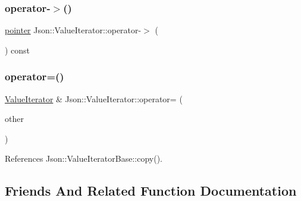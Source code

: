\mbox{\label{classJson_1_1ValueIterator_a8dfc1603f92467591d524d0326f35534_a8dfc1603f92467591d524d0326f35534}} 
\subsubsection{\texorpdfstring{operator-\/$>$()}{operator->()}}
{\footnotesize\ttfamily \hyperlink{classJson_1_1ValueIterator_acec45feb1ef1f3bf81240157d06d5432_acec45feb1ef1f3bf81240157d06d5432}{pointer} Json\+::\+Value\+Iterator\+::operator-\/$>$ (\begin{DoxyParamCaption}{ }\end{DoxyParamCaption}) const\hspace{0.3cm}{\ttfamily [inline]}}

\mbox{\label{classJson_1_1ValueIterator_a8e23312b1db874f7e403fd7e76611bdc_a8e23312b1db874f7e403fd7e76611bdc}} 
\subsubsection{\texorpdfstring{operator=()}{operator=()}}
{\footnotesize\ttfamily \hyperlink{classJson_1_1ValueIterator}{Value\+Iterator} \& Json\+::\+Value\+Iterator\+::operator= (\begin{DoxyParamCaption}\item[{const \hyperlink{classJson_1_1ValueIteratorBase_a9d2a940d03ea06d20d972f41a89149ee_a9d2a940d03ea06d20d972f41a89149ee}{Self\+Type} \&}]{other }\end{DoxyParamCaption})}



References Json\+::\+Value\+Iterator\+Base\+::copy().



\subsection{Friends And Related Function Documentation}
\mbox{\label{classJson_1_1ValueIterator_aeceedf6e1a7d48a588516ce2b1983d6f_aeceedf6e1a7d48a588516ce2b1983d6f}} 
